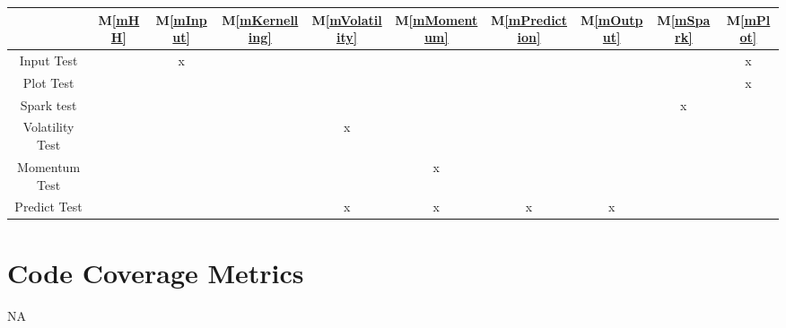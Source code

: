 \documentclass[12pt, titlepage]{article}
\newcommand{\mref}[1]{M\ref{#1}}
\begin{document}
\begin{table}[h!]
\centering
\begin{tabular}{|c|c|c|c|c|c|c|c|c|c|}
\hline
& \mref{mHH}& \mref{mInput}& \mref{mKernelling}& \mref{mVolatility}& \mref{mMomentum}& \mref{mPrediction}& \mref{mOutput}& \mref{mSpark}& \mref{mPlot}\\
\hline
Input Test &&x&& && & & &x\\ \hline
Plot Test &&&& & & & & &x \\ \hline
Spark test &&&& && & & x& \\ \hline
Volatility Test &&&& x& & & & & \\ \hline
Momentum Test &&&& &x & & & & \\ \hline
Predict Test &&&& x& x&x & x& & \\ \hline

\end{tabular}
\label{Table:R_trace}
\end{table}
\section{Code Coverage Metrics}
NA



\end{document}
